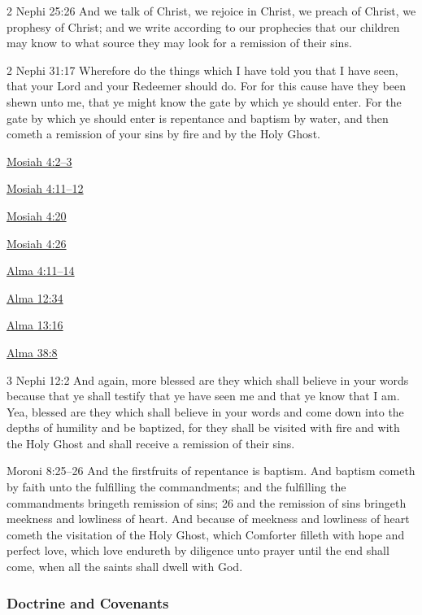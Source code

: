		\begin{compactdesc}
			\item[2 Nephi 25:26] And we talk of Christ, we rejoice in Christ, we preach of Christ, we prophesy of Christ; and we write according to our prophecies that our children may know to what source they may look for a remission of their sins. 
			\item[2 Nephi 31:17] Wherefore do the things which I have told you that I have seen, that your Lord and your Redeemer should do. For for this cause have they been shewn unto me, that ye might know the gate by which ye should enter. For the gate by which ye should enter is repentance and baptism by water, and then cometh a remission of your sins by fire and by the Holy Ghost.
			\item[{\hyperref[MOSIAH-4-2]{Mosiah 4:2--3}}]
			\item[{\hyperref[MOSIAH-4-11]{Mosiah 4:11--12}}]
			\item[{\hyperref[MOSIAH-4-20]{Mosiah 4:20}}]
			\item[{\hyperref[MOSIAH-4-26]{Mosiah 4:26}}]
			\item[{\hyperref[ALMA-4-11]{Alma 4:11--14}}]
			\item[{\hyperref[ALMA-12-34]{Alma 12:34}}]
			\item[{\hyperref[ALMA-13-16]{Alma 13:16}}]
			\item[{\hyperref[ALMA-38-8]{Alma 38:8}}]
			\item[3 Nephi 12:2]  And again, more blessed are they which shall believe in your words because that ye shall testify that ye have seen me and that ye know that I am. Yea, blessed are they which shall believe in your words and come down into the depths of humility and be baptized, for they shall be visited with fire and with the Holy Ghost and shall receive a remission of their sins. 
			\item[Moroni 8:25--26] And the firstfruits of repentance is baptism. And baptism cometh by faith unto the fulfilling the commandments; and the fulfilling the commandments bringeth remission of sins; 26 and the remission of sins bringeth meekness and lowliness of heart. And because of meekness and lowliness of heart cometh the visitation of the Holy Ghost, which Comforter filleth with hope and perfect love, which love endureth by diligence unto prayer until the end shall come, when all the saints shall dwell with God. 
		\end{compactdesc}
		
	\subsubsection{Doctrine and Covenants} %
		\label{REMISSION-DC}
	

